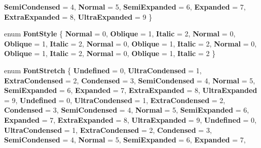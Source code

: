\begin{DoxyCompactItemize}
\newline
{\bfseries Semi\+Condensed} = 4, 
{\bfseries Normal} = 5, 
{\bfseries Semi\+Expanded} = 6, 
{\bfseries Expanded} = 7, 
\newline
{\bfseries Extra\+Expanded} = 8, 
{\bfseries Ultra\+Expanded} = 9
 \}
\item 
\mbox{\label{namespace_windows_1_1_u_i_1_1_text_a60a89aee1a9831c91a4aabca7103b5e8}} 
enum {\bfseries Font\+Style} \{ \newline
{\bfseries Normal} = 0, 
{\bfseries Oblique} = 1, 
{\bfseries Italic} = 2, 
{\bfseries Normal} = 0, 
\newline
{\bfseries Oblique} = 1, 
{\bfseries Italic} = 2, 
{\bfseries Normal} = 0, 
{\bfseries Oblique} = 1, 
\newline
{\bfseries Italic} = 2, 
{\bfseries Normal} = 0, 
{\bfseries Oblique} = 1, 
{\bfseries Italic} = 2, 
\newline
{\bfseries Normal} = 0, 
{\bfseries Oblique} = 1, 
{\bfseries Italic} = 2
 \}
\item 
\mbox{\label{namespace_windows_1_1_u_i_1_1_text_a5d8427c75e3dbef5872b8609b90b88e2}} 
enum {\bfseries Font\+Stretch} \{ \newline
{\bfseries Undefined} = 0, 
{\bfseries Ultra\+Condensed} = 1, 
{\bfseries Extra\+Condensed} = 2, 
{\bfseries Condensed} = 3, 
\newline
{\bfseries Semi\+Condensed} = 4, 
{\bfseries Normal} = 5, 
{\bfseries Semi\+Expanded} = 6, 
{\bfseries Expanded} = 7, 
\newline
{\bfseries Extra\+Expanded} = 8, 
{\bfseries Ultra\+Expanded} = 9, 
{\bfseries Undefined} = 0, 
{\bfseries Ultra\+Condensed} = 1, 
\newline
{\bfseries Extra\+Condensed} = 2, 
{\bfseries Condensed} = 3, 
{\bfseries Semi\+Condensed} = 4, 
{\bfseries Normal} = 5, 
\newline
{\bfseries Semi\+Expanded} = 6, 
{\bfseries Expanded} = 7, 
{\bfseries Extra\+Expanded} = 8, 
{\bfseries Ultra\+Expanded} = 9, 
\newline
{\bfseries Undefined} = 0, 
{\bfseries Ultra\+Condensed} = 1, 
{\bfseries Extra\+Condensed} = 2, 
{\bfseries Condensed} = 3, 
\newline
{\bfseries Semi\+Condensed} = 4, 
{\bfseries Normal} = 5, 
{\bfseries Semi\+Expanded} = 6, 
{\bfseries Expanded} = 7, 
\newline

\end{DoxyCompactItemize}
